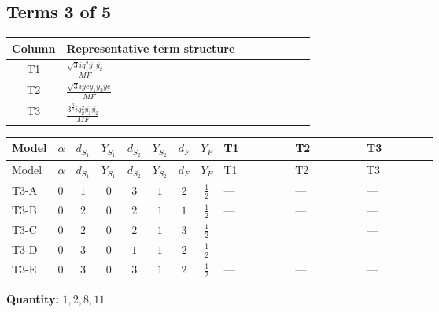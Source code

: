 \documentclass[8pt]{article}
\begin{document}
\begin{landscape}
\subsection*{Terms 3 of 5}
\begin{center}
\begin{tabular}{@{}c >{\raggedright\arraybackslash}p{0.82\linewidth}@{}}
\toprule
Column & Representative term structure \\
\midrule
T1 & \(\displaystyle \frac{\sqrt{3} i g_{1}^{2} \overline{y_{1}} \overline{y_{2}}}{MF}\) \\
\midrule
T2 & \(\displaystyle \frac{\sqrt{3} i ye \overline{y_{1}} \overline{y_{2}} \overline{ye}}{MF}\) \\
\midrule
T3 & \(\displaystyle \frac{3^{\frac{3}{4}} i g_{2}^{2} \overline{y_{1}} \overline{y_{2}}}{MF}\) \\
\midrule
\bottomrule
\end{tabular}
\end{center}
\smallskip
\tiny
\begin{longtable}{@{}llcccccc >{\raggedright\arraybackslash}p{0.21\linewidth} >{\raggedright\arraybackslash}p{0.21\linewidth} >{\raggedright\arraybackslash}p{0.21\linewidth}@{}}
\toprule
Model & $\alpha$ & $d_{S_1}$ & $Y_{S_1}$ & $d_{S_2}$ & $Y_{S_2}$ & $d_F$ & $Y_F$ & T1 & T2 & T3 \\
\midrule
\endfirsthead
\toprule
Model & $\alpha$ & $d_{S_1}$ & $Y_{S_1}$ & $d_{S_2}$ & $Y_{S_2}$ & $d_F$ & $Y_F$ & T1 & T2 & T3 \\
\midrule
\endhead
T3-A & $0$ & $1$ & $0$ & $3$ & $1$ & $2$ & $\frac{1}{2}$ & --- & --- & --- \\
\midrule
T3-B & $0$ & $2$ & $0$ & $2$ & $1$ & $1$ & $\frac{1}{2}$ & --- & --- & --- \\
\midrule
T3-C & $0$ & $2$ & $0$ & $2$ & $1$ & $3$ & $\frac{1}{2}$ & \scriptsize\adjustbox{max width=\linewidth}{$\begin{gathered} - \frac{\sqrt{3} i g_{1}^{2} \overline{y_{1}} \overline{y_{2}}}{16 MF}\end{gathered}$} & \scriptsize\adjustbox{max width=\linewidth}{$\begin{gathered} \frac{\sqrt{3} i ye \overline{y_{1}} \overline{y_{2}} \overline{ye}}{24 MF}\end{gathered}$} & --- \\
\midrule
T3-D & $0$ & $3$ & $0$ & $1$ & $1$ & $2$ & $\frac{1}{2}$ & --- & --- & \scriptsize\adjustbox{max width=\linewidth}{$\begin{gathered} - \frac{25 \cdot 3^{\frac{3}{4}} i g_{2}^{2} \overline{y_{1}} \overline{y_{2}}}{24 MF}\end{gathered}$} \\
\midrule
T3-E & $0$ & $3$ & $0$ & $3$ & $1$ & $2$ & $\frac{1}{2}$ & --- & --- & --- \\
\midrule
\bottomrule
\end{longtable}
\clearpage
\noindent\textbf{Quantity: }$\mathrm{1,2,8,11}$\par\smallskip

\end{landscape}
\end{document}
